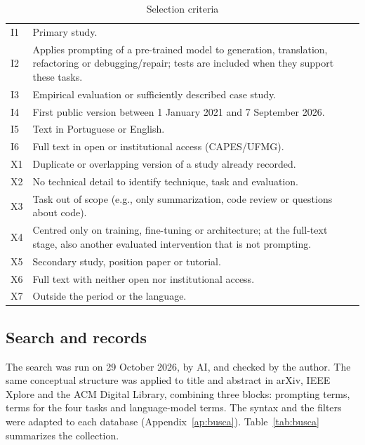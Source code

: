 \begin{table}[!htb]
\caption{Selection criteria}\label{tab:criterios}
\centering\footnotesize
\begin{tabular}{@{}lp{}@{}}
\hline
I1 & Primary study.\\
I2 & Applies prompting of a pre-trained model to generation, translation, refactoring or debugging/repair; tests are included when they support these tasks.\\
I3 & Empirical evaluation or sufficiently described case study.\\
I4 & First public version between 1 January 2021 and 7 September 2026.\\
I5 & Text in Portuguese or English.\\
I6 & Full text in open or institutional access (CAPES/UFMG).\\
\hline
X1 & Duplicate or overlapping version of a study already recorded.\\
X2 & No technical detail to identify technique, task and evaluation.\\
X3 & Task out of scope (e.g., only summarization, code review or questions about code).\\
X4 & Centred only on training, fine-tuning or architecture; at the full-text stage, also another evaluated intervention that is not prompting.\\
X5 & Secondary study, position paper or tutorial.\\
X6 & Full text with neither open nor institutional access.\\
X7 & Outside the period or the language.\\
\hline
\end{tabular}
\end{table}

\subsection{Search and records}\label{sec:busca}
The search was run on 29 October 2026, by AI, and checked by the author. The same conceptual structure was
applied to title and abstract in arXiv, IEEE Xplore and the ACM Digital Library, combining three blocks:
prompting terms, terms for the four tasks and language-model terms. The syntax and the
filters were adapted to each database (Appendix~\ref{ap:busca}). Table~\ref{tab:busca} summarizes the collection.

